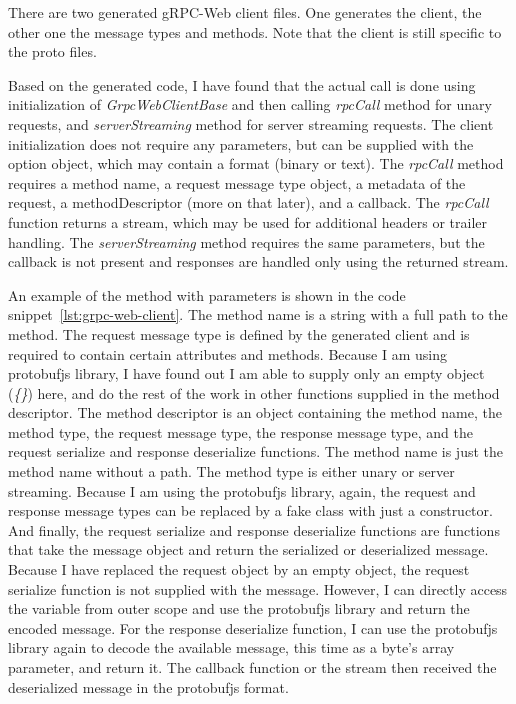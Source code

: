 There are two generated gRPC-Web client files.
One generates the client, the other one the message types and methods.
Note that the client is still specific to the proto files.

Based on the generated code, I have found that the actual call is done using initialization of \textit{GrpcWebClientBase} and then calling \textit{rpcCall} method for unary requests, and \textit{serverStreaming} method for server streaming requests.
The client initialization does not require any parameters, but can be supplied with the option object, which may contain a format (binary or text).
The \textit{rpcCall} method requires a method name, a request message type object, a metadata of the request, a methodDescriptor (more on that later), and a callback.
The \textit{rpcCall} function returns a stream, which may be used for additional headers or trailer handling.
The \textit{serverStreaming} method requires the same parameters, but the callback is not present and responses are handled only using the returned stream.

An example of the method with parameters is shown in the code snippet~\ref{lst:grpc-web-client}.
The method name is a string with a full path to the method.
The request message type is defined by the generated client and is required to contain certain attributes and methods.
Because I am using protobufjs library, I have found out I am able to supply only an empty object (\textit{\{\}}) here, and do the rest of the work in other functions supplied in the method descriptor.
The method descriptor is an object containing the method name, the method type, the request message type, the response message type, and the request serialize and response deserialize functions.
The method name is just the method name without a path.
The method type is either unary or server streaming.
Because I am using the protobufjs library, again, the request and response message types can be replaced by a fake class with just a constructor.
And finally, the request serialize and response deserialize functions are functions that take the message object and return the serialized or deserialized message.
Because I have replaced the request object by an empty object, the request serialize function is not supplied with the message.
However, I can directly access the variable from outer scope and use the protobufjs library and return the encoded message.
For the response deserialize function, I can use the protobufjs library again to decode the available message, this time as a byte's array parameter, and return it.
The callback function or the stream then received the deserialized message in the protobufjs format.

